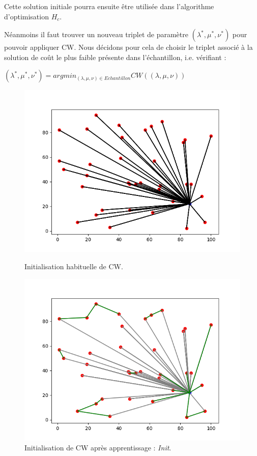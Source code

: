 \documentclass[a4paper,11pt]{article}%
\begin{document}
Cette solution initiale pourra ensuite être utilisée dans l'algorithme d'optimisation $H_c$.

Néanmoins il faut trouver un nouveau triplet de paramètre $(\lambda^*,\mu^*,\nu^*)$ pour pouvoir appliquer CW. Nous décidons pour cela de choisir le triplet associé à la solution de coût le plus faible présente dans l'échantillon, i.e. vérifiant :
\begin{center}
$(\lambda^*,\mu^*,\nu^*) = argmin_{(\lambda,\mu,\nu) \in Echantillon} CW((\lambda,\mu,\nu))$
\end{center}

\begin{figure}[h!]
    \begin{minipage}[c]{.46\linewidth}
        \centering
        \includegraphics[scale=0.4]{CWinit.png}
        \caption{Initialisation habituelle de CW.}
    \end{minipage}
    \hfill%
    \begin{minipage}[c]{.46\linewidth}
        \centering
        \includegraphics[scale=0.4]{learning.png}
        \caption{Initialisation de CW après apprentissage : \emph{Init}.}
        \label{newInit}
    \end{minipage}
\end{figure}
\end{document}
